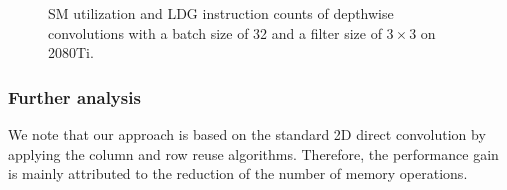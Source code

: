 \begin{figure}
    \centering
    \qquad
    \vspace{5mm}
    \vspace{-4mm}
    \caption{SM utilization and LDG instruction counts of depthwise convolutions with a batch size of 32 and a filter size of $3\times3$ on 2080Ti.}
    \label{fig:dwratio}
\end{figure}

\subsubsection{Further analysis}
We note that our approach is based on the standard 2D direct convolution by applying the column and row reuse algorithms. 
Therefore, the performance gain is mainly attributed to the reduction of the number of memory operations. 

